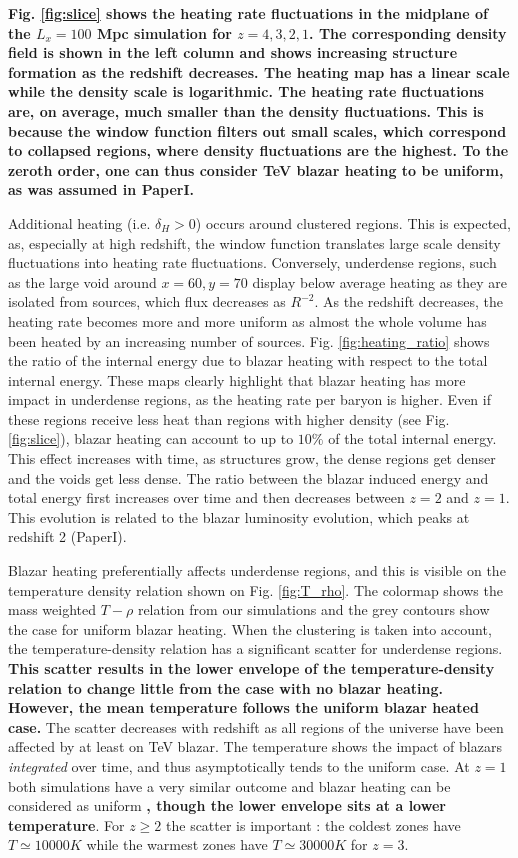 \documentclass[twocolumns]{emulateapj}
\newcommand\ALc[1]{{\color{red} \bf #1}} %
\newcommand\Pc[1]{{\color{cyan} \bf #1}} %
\begin{document}
\ALc{Fig. \ref{fig:slice} shows the heating rate fluctuations in the midplane of the $L_x=100$ Mpc simulation for $z=4,3,2,1$.  The corresponding density field is shown in the left column and shows increasing structure formation as the redshift decreases.  The heating map has a linear scale while the density scale is logarithmic. The heating rate fluctuations are, on average, much smaller than the density fluctuations. This is because the window function filters out small scales, which correspond to collapsed regions,  where density fluctuations are the highest. To the zeroth order, one can thus consider TeV blazar heating to be uniform, as was assumed in PaperI.



Additional heating (i.e. $\delta_H>0$) occurs around clustered regions. This is expected, as, especially at high redshift, the window function translates large scale density fluctuations into heating rate fluctuations.  Conversely, underdense regions, such as the large void around $x=60,y=70$ display below average heating as they are isolated from sources, which flux decreases as $R^{-2}$. As the redshift decreases, the heating rate becomes more and more uniform as almost the whole volume has been heated by an increasing number of sources.
Fig. \ref{fig:heating_ratio} shows the ratio of the internal energy due to  blazar heating with respect to the total internal energy.  These maps clearly highlight that blazar heating has more impact in underdense regions, as the heating rate per baryon is higher. Even if these regions receive less heat than regions with higher density (see Fig. \ref{fig:slice}), blazar heating can account to up to $10\%$ of the total internal energy.  This effect increases with time, as structures grow, the dense regions get denser and the voids get less dense. The ratio between the blazar induced energy and total energy first increases over time and then decreases between $z=2$ and $z=1$.  This evolution is related to the blazar luminosity evolution, which peaks at redshift 2 (PaperI).


Blazar heating preferentially affects underdense regions, and this is visible on the temperature density relation shown on Fig. \ref{fig:T_rho}. The colormap shows the mass weighted $T-\rho$ relation from our simulations and the grey contours show the case for uniform blazar heating. When the clustering is taken into account, the temperature-density relation has a significant scatter for underdense regions. \Pc{This scatter results in the lower envelope of the temperature-density relation to change little from the case with no blazar heating.  However, the mean temperature follows the uniform blazar heated case. }The scatter decreases with redshift as all regions of the universe have been affected by at least on TeV blazar. The temperature shows the impact of blazars \textit{integrated} over time, and thus asymptotically tends to the uniform case. At $z=1$ both simulations have a very similar outcome and blazar heating can be considered as uniform\Pc{, though the lower envelope sits at a lower temperature}. For $z\geqslant 2$ the scatter is important :  the coldest zones have $T\simeq 10 000K$ while the warmest zones have $T\simeq 30 000K$ for $z=3$. 

}
\end{document}
